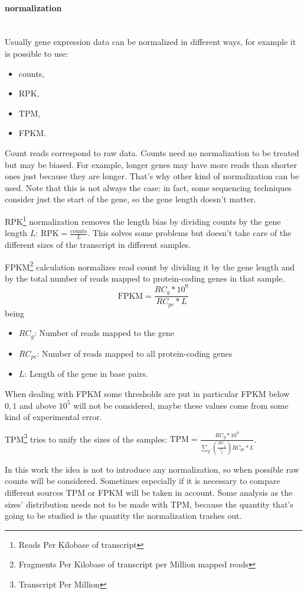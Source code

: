 \paragraph{normalization}\mbox{}\\
Usually gene expression data can be normalized in different ways, for example it is possible to use:
\begin{itemize}
	\item counts,
	\item RPK,
	\item TPM,
	\item FPKM.
\end{itemize}
Count reads correspond to raw data. Counts need no normalization to be treated but may be biased. For example, longer genes may have more reads than shorter ones just because they are longer. That's why other kind of normalization can be used. Note that this is not always the case: in fact, some sequencing techniques consider just the start of the gene, so the gene length doesn't matter.   

RPK\footnote{Reads Per Kilobase of transcript} normalization removes the length bias by dividing counts by the gene length $L$: \(\text{RPK}=\frac{\text{counts}}{L}\). This solves some problems but doesn't take care of the different sizes of the transcript in different samples.

FPKM\footnote{Fragments Per Kilobase of transcript per Million mapped reads} calculation normalizes read count by dividing it by the gene length and by the total number of reads mapped to protein-coding genes in that sample.
\[
\text{FPKM} = \frac{RC_g*10^9}{RC_{pc}*L}
\]
being
\begin{itemize}
	\item $RC_g$: Number of reads mapped to the gene
	\item $RC_{pc}$: Number of reads mapped to all protein-coding genes
	\item $L$: Length of the gene in base pairs.
\end{itemize}
When dealing with FPKM some thresholds are put in particular FPKM below $0,1$ and above $10^5$ will not be considered, maybe these values come from some kind of experimental error.

TPM\footnote{Transcript Per Million} tries to unify the sizes of the samples: $\text{TPM} = \frac{RC_g*10^9}{\sum_{g\prime} \left(\frac{RC_{g^\prime}}{l_{g^\prime}}\right) RC_{pc}*L}$.

In this work the idea is not to introduce any normalization, so when possible raw counts will be considered. Sometimes especially if it is necessary to compare different sources TPM or FPKM will be taken in account. Some analysis as the sizes' distribution needs not to be made with TPM, because the quantity that's going to be studied is the quantity the normalization trashes out.

